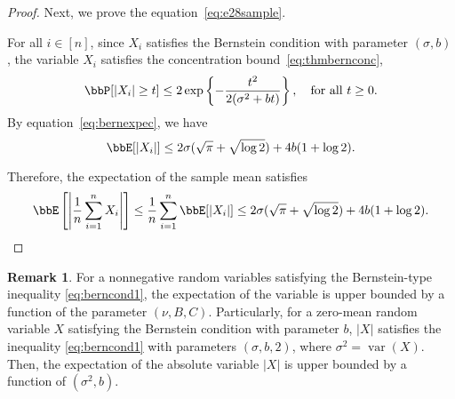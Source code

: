 \documentclass[11pt]{article}
\DeclareMathOperator{\var}{var}
\newcommand{\off}[1]{\left[#1\right]}
\newcommand{\offf}[1]{\left\{#1\right\}}
\newcommand{\aabs}[1]{\left|#1\right|}
\theoremstyle{plain}
\theoremstyle{definition}
\newtheorem{rmk}{Remark}
\begin{document}
\begin{proof}
	\vspace{0.2cm}
	Next, we prove the equation~\eqref{eq:e28sample}.
	
	\vspace{0.2cm}
	For all $i \in [n]$, since $X_i$ satisfies the Bernstein condition with parameter $(\sigma,b)$, the variable $X_i$ satisfies the concentration bound~\eqref{eq:thmbernconc},
	\begin{equation}
		\bbP[|X_i| \geq t] \leq 2 \exp \offf{- \frac{t^2}{2(\sigma^2 + bt)}}, \quad \text{for all }t \geq 0. 
	\end{equation}
	By equation~\eqref{eq:bernexpec}, we have
	\begin{equation}
		\bbE[|X_i|] \leq  2 \sigma (\sqrt{\pi} + \sqrt{\log 2}) + 4b (1 + \log 2).
	\end{equation}
	
	Therefore, the expectation of the sample mean satisfies
	\begin{equation}
		\bbE \off{ \aabs{\frac{1}{n} \sum_{i=1}^n X_i }} \leq \frac{1}{n} \sum_{i=1}^n \bbE[|X_i|] \leq 2 \sigma (\sqrt{\pi} + \sqrt{\log 2}) + 4b (1 + \log 2).
	\end{equation}
	
\end{proof}

\begin{rmk}
	For a nonnegative random variables satisfying the Bernstein-type inequality \eqref{eq:berncond1}, the expectation of the variable is upper bounded by a function of the parameter $(\nu,B,C)$. Particularly, for a zero-mean random variable $X$ satisfying the Bernstein condition with parameter $b$, $|X|$ satisfies the inequality \eqref{eq:berncond1} with parameters $(\sigma,b,2)$, where $\sigma^2 = \var(X)$.  Then, the expectation of the absolute variable $|X|$ is upper bounded by a function of $(\sigma^2, b)$. 
\end{rmk}
\end{document}

